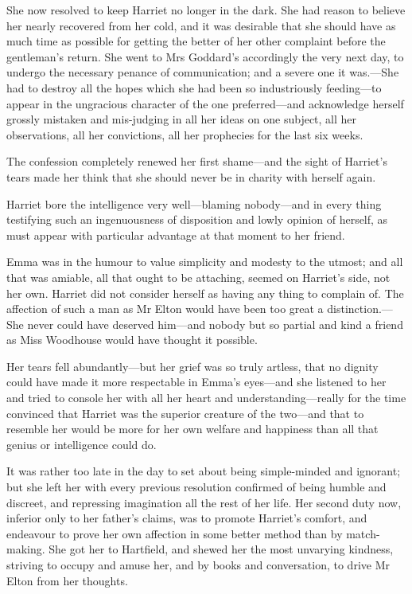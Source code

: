 She now resolved to keep Harriet no longer in the dark. She had reason to believe her nearly recovered from her cold, and it was desirable that she should have as much time as possible for getting the better of her other complaint before the gentleman's return. She went to Mrs Goddard's accordingly the very next day, to undergo the necessary penance of communication; and a severe one it was.—She had to destroy all the hopes which she had been so industriously feeding—to appear in the ungracious character of the one preferred—and acknowledge herself grossly mistaken and mis-judging in all her ideas on one subject, all her observations, all her convictions, all her prophecies for the last six weeks.

The confession completely renewed her first shame—and the sight of Harriet's tears made her think that she should never be in charity with herself again.

Harriet bore the intelligence very well—blaming nobody—and in every thing testifying such an ingenuousness of disposition and lowly opinion of herself, as must appear with particular advantage at that moment to her friend.

Emma was in the humour to value simplicity and modesty to the utmost; and all that was amiable, all that ought to be attaching, seemed on Harriet's side, not her own. Harriet did not consider herself as having any thing to complain of. The affection of such a man as Mr Elton would have been too great a distinction.—She never could have deserved him—and nobody but so partial and kind a friend as Miss Woodhouse would have thought it possible.

Her tears fell abundantly—but her grief was so truly artless, that no dignity could have made it more respectable in Emma's eyes—and she listened to her and tried to console her with all her heart and understanding—really for the time convinced that Harriet was the superior creature of the two—and that to resemble her would be more for her own welfare and happiness than all that genius or intelligence could do.

It was rather too late in the day to set about being simple-minded and ignorant; but she left her with every previous resolution confirmed of being humble and discreet, and repressing imagination all the rest of her life. Her second duty now, inferior only to her father's claims, was to promote Harriet's comfort, and endeavour to prove her own affection in some better method than by match-making. She got her to Hartfield, and shewed her the most unvarying kindness, striving to occupy and amuse her, and by books and conversation, to drive Mr Elton from her thoughts.


